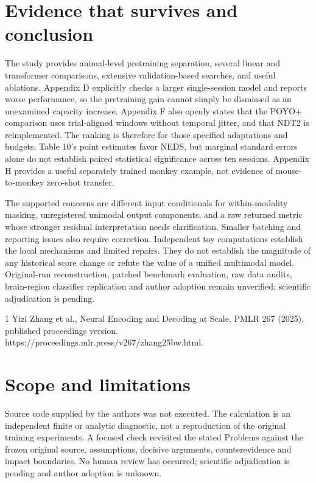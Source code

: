 \documentclass[10pt]{article}
\begin{document}
\section*{Evidence that survives and conclusion}
The study provides animal-level pretraining separation, several linear and transformer comparisons, extensive validation-based searches, and useful ablations. Appendix D explicitly checks a larger single-session model and reports worse performance, so the pretraining gain cannot simply be dismissed as an unexamined capacity increase. Appendix F also openly states that the POYO+ comparison uses trial-aligned windows without temporal jitter, and that NDT2 is reimplemented. The ranking is therefore for those specified adaptations and budgets. Table 10’s point estimates favor NEDS, but marginal standard errors alone do not establish paired statistical significance across ten sessions. Appendix H provides a useful separately trained monkey example, not evidence of mouse-to-monkey zero-shot transfer.\par
The supported concerns are different input conditionals for within-modality masking, unregistered unimodal output components, and a raw returned metric whose stronger residual interpretation needs clarification. Smaller batching and reporting issues also require correction. Independent toy computations establish the local mechanisms and limited repairs. They do not establish the magnitude of any historical score change or refute the value of a unified multimodal model. Original-run reconstruction, patched benchmark evaluation, raw data audits, brain-region classifier replication and author adoption remain unverified; scientific adjudication is pending.\par
1 Yizi Zhang et al., Neural Encoding and Decoding at Scale, PMLR 267 (2025), published proceedings version. https://proceedings.mlr.press/v267/zhang25bw.html.\par
\section*{Scope and limitations}
Source code supplied by the authors was not executed. The calculation is an independent finite or analytic diagnostic, not a reproduction of the original training experiments. A focused check revisited the stated Problems against the frozen original source, assumptions, decisive arguments, counterevidence and impact boundaries. No human review has occurred; scientific adjudication is pending and author adoption is unknown.\par
\end{document}
